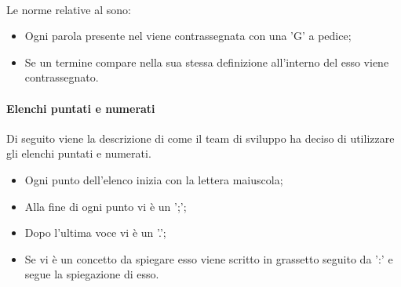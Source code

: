 \paragraph{\docNameGlo}
Le norme relative al \docNameGloLow{} sono:
\begin{itemize}
    \item Ogni parola presente nel \docNameGloLow{} viene contrassegnata con una 'G' a pedice;
    \item Se un termine compare nella sua stessa definizione all'interno del \docNameGloLow{} esso viene contrassegnato.
\end{itemize}

\paragraph{Elenchi puntati e numerati}
Di seguito viene la descrizione di come il team di sviluppo ha deciso di utilizzare gli elenchi puntati e numerati.
\begin {itemize}
\item Ogni punto dell'elenco inizia con la lettera maiuscola;
\item Alla fine di ogni punto vi è un ';';
\item Dopo l'ultima voce vi è un '.';
\item Se vi è un concetto da spiegare esso viene scritto in grassetto seguito da ':' e segue la spiegazione di esso.
\end {itemize}
